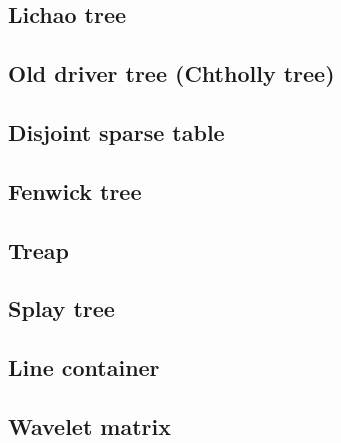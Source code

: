 \subsection{Lichao tree}

\subsection{Old driver tree (Chtholly tree)}

\subsection{Disjoint sparse table}

\subsection{Fenwick tree}

\subsection{Treap}

\subsection{Splay tree}

\subsection{Line container}

\subsection{Wavelet matrix}
